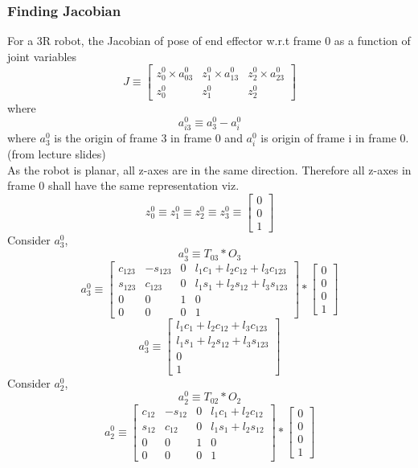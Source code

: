 \documentclass[12pt]{article}
\newcommand{\fromlectures}{{\\ \color{blue} \hspace*{\fill}(from lecture slides)} \\}
\begin{document}
\subsubsection*{Finding Jacobian}
For a 3R robot, the Jacobian of pose of end effector w.r.t frame 0 as a function of joint variables
\[
  J \equiv
  \begin{bmatrix} z_0^0 \times a_{03}^0 & z_1^0 \times a_{13}^0 & z_2^0 \times a_{23}^0 \\ z_0^0 & z_1^0 & z_2^0 \end{bmatrix}
\]
where
\[
  a_{i3}^{0} \equiv a_{3}^{0} - a_{i}^{0}
\]
where $a_3^0$ is the origin of frame 3 in frame 0 and $a_i^0$ is origin of frame i in frame 0.
\fromlectures

As the robot is planar, all z-axes are in the same direction.
Therefore all z-axes in frame 0 shall have the same representation viz.
\[
  z_0^{0} \equiv z_1^{0} \equiv z_2^{0} \equiv z_3^{0} \equiv \begin{bmatrix} 0 \\ 0 \\ 1 \end{bmatrix}
\]
Consider $a_{3}^{0}$,
\[
  a_3^0 \equiv T_{03} * O_3
\]
\[
  a_3^0 \equiv
  \begin{bmatrix}
    c_{123} & -s_{123} & 0 & l_1c_1 + l_2c_{12} + l_3c_{123}\\
    s_{123} & c_{123}  & 0 & l_1s_1 + l_2s_{12} + l_3s_{123}\\
    0 & 0 & 1 & 0 \\
    0 & 0 & 0 & 1
  \end{bmatrix}
  *
  \begin{bmatrix} 0 \\ 0 \\ 0 \\ 1 \end{bmatrix}
\]
\[
  a_3^0 \equiv
  \begin{bmatrix}
    l_1c_1 + l_2c_{12} + l_3c_{123}\\
    l_1s_1 + l_2s_{12} + l_3s_{123}\\
    0 \\
    1
  \end{bmatrix}
\]
Consider $a_{2}^{0}$,
\[
  a_2^0 \equiv T_{02} * O_2
\]
\[
  a_2^0 \equiv
  \begin{bmatrix} c_{12} & -s_{12} & 0 & l_1c_1 + l_2c_{12} \\ s_{12} & c_{12} & 0 & l_1s_1 + l_2s_{12} \\ 0 & 0 & 1 & 0 \\ 0 & 0 & 0 & 1 \end{bmatrix}
  *
  \begin{bmatrix} 0 \\ 0 \\ 0 \\ 1 \end{bmatrix}
\]
\end{document}
